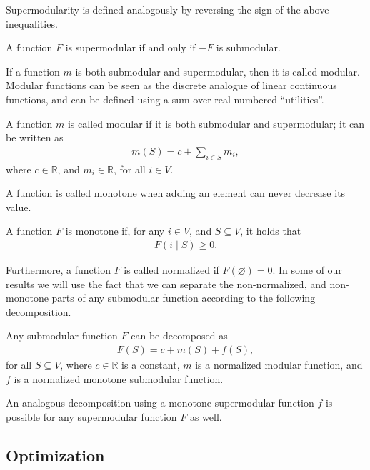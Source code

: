 Supermodularity is defined analogously by reversing the sign of the above inequalities.
\begin{definition}[Supermodularity] \label{def:supermod}
A function $F$ is supermodular if and only if $-F$ is submodular.
\end{definition}

If a function $m$ is both submodular and supermodular, then it is called modular.
Modular functions can be seen as the discrete analogue of linear continuous functions, and can be defined using a sum over real-numbered ``utilities''.
\begin{definition}[Modularity]
A function $m$ is called modular if it is both submodular and supermodular; it can be written as
\begin{align*}
m(S) = c + \sum_{i \in S} m_i,
\end{align*}
where $c \in \mathbb{R}$, and $m_i \in \mathbb{R}$, for all $i \in V$.
\end{definition}

A function is called monotone when adding an element can never decrease its value.
\begin{definition}[Monotonicity]
A function $F$ is monotone if, for any $i \in V$, and $S \subseteq V$, it holds that
\begin{align*}
F(i \mid S) \geq 0.
\end{align*}
\end{definition}
Furthermore, a function $F$ is called normalized if $F(\varnothing) = 0$.
In some of our results we will use the fact that we can separate the non-normalized, and non-monotone parts of any submodular function according to the following decomposition.
\begin{definition} \label{def:decomp}
Any submodular function $F$ can be decomposed as
\begin{align} \label{eq:decomp}
  F(S) = c + m(S) + f(S),
\end{align}
for all $S \subseteq V$, where $c \in \mathbb{R}$ is a constant, $m$ is a normalized modular function, and $f$ is a normalized monotone submodular function.
\end{definition}
An analogous decomposition using a monotone supermodular function $f$ is possible for any supermodular function $F$ as well.

\subsection{Optimization}


